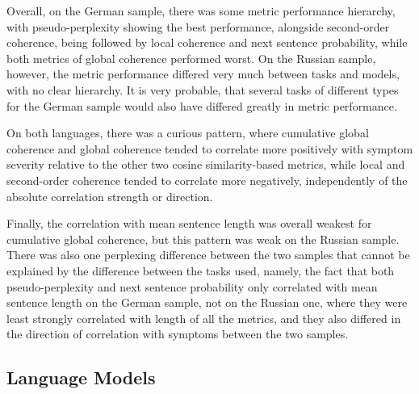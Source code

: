 
Overall, on the German sample, there was some metric performance hierarchy, with pseudo-perplexity showing the best performance, alongside second-order coherence, being followed by local coherence and next sentence probability, while both metrics of global coherence performed worst. On the Russian sample, however, the metric performance differed very much between tasks and models, with no clear hierarchy. It is very probable, that several tasks of different types for the German sample would also have differed greatly in metric performance.

On both languages, there was a curious pattern, where cumulative global coherence and global coherence tended to correlate more positively with symptom severity relative to the other two cosine similarity-based metrics, while local and second-order coherence tended to correlate more negatively, independently of the absolute correlation strength or direction. 

Finally, the correlation with mean sentence length was overall weakest for cumulative global coherence, but this pattern was weak on the Russian sample. There was also one perplexing difference between the two samples that cannot be explained by the difference between the tasks used, namely, the fact that both pseudo-perplexity and next sentence probability only correlated with mean sentence length on the German sample, not on the Russian one, where they were least strongly correlated with length of all the metrics, and they also differed in the direction of correlation with symptoms between the two samples.

\subsection{Language Models}
\label{sec:discussion:LM:models}

